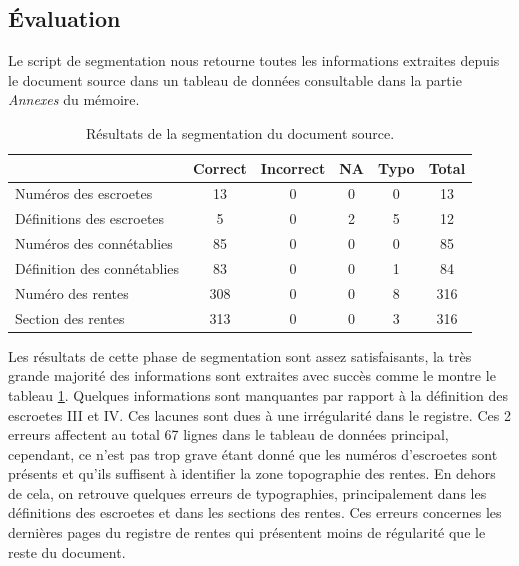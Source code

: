 \subsection{Évaluation}
Le script de segmentation nous retourne toutes les informations extraites depuis le document source dans un tableau de données consultable dans la partie \textit{Annexes} du mémoire. 
\begin{table}[ht]
    \centering
    \begin{tabular}{|l||c|c|c|c|c|}
        \hline		&	Correct	&	Incorrect	&	NA	&	Typo	&	Total \\
        \hline
        \hline	Numéros des escroetes	&	13	&	0	&	0	&	0	&	13\\
        \hline	Définitions des escroetes	&	5	&	0	&	2	&	5	&	12 \\
        \hline	Numéros des connétablies	&	85	&	0	&	0	&	0	&	85 \\
        \hline	Définition des connétablies	&	83	&	0	&	0	&	1	&	84 \\
        \hline	Numéro des rentes	&	308	&	0	&	0	&	8	&	316 \\
        \hline	Section des rentes	&	313	&	0	&	0	&	3	&	316 \\
        \hline
    \end{tabular}
    \caption{Résultats de la segmentation du document source.}
    \label{eval_seg}
\end{table}

Les résultats de cette phase de segmentation sont assez satisfaisants, la très grande majorité des informations sont extraites avec succès comme le montre le tableau \ref{eval_seg}. 
Quelques informations sont manquantes par rapport à la définition des escroetes III et IV. Ces lacunes sont dues à une irrégularité dans le registre. Ces 2 erreurs affectent au total 67 lignes dans le tableau de données principal, cependant, ce n'est pas trop grave étant donné que les numéros d'escroetes sont présents et qu'ils suffisent à identifier la zone topographie des rentes. En dehors de cela, on retrouve quelques erreurs de typographies, principalement dans les définitions des escroetes et dans les sections des rentes. Ces erreurs concernes les dernières pages du registre de rentes qui présentent moins de régularité que le reste du document.
